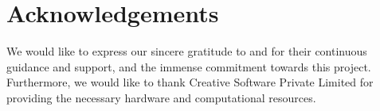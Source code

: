 \chapter*{Acknowledgements}

\vspace{10mm}
We would like to express our sincere gratitude to \supervisorA{} and \supervisorB{} for their continuous guidance and support, and the immense commitment towards this project. Furthermore, we would like to thank Creative Software Private Limited for providing the necessary hardware and computational resources.

